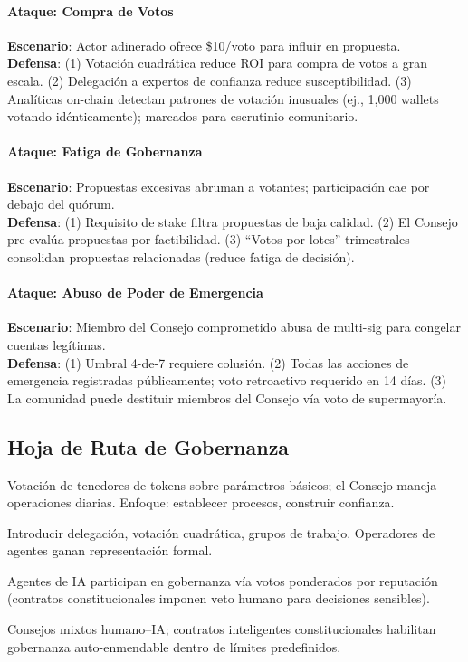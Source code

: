 \documentclass[11pt]{article}
\begin{document}
\paragraph{Ataque: Compra de Votos}
\textbf{Escenario}: Actor adinerado ofrece \$10/voto para influir en propuesta.\\
\textbf{Defensa}: (1) Votación cuadrática reduce ROI para compra de votos a gran escala. (2) Delegación a expertos de confianza reduce susceptibilidad. (3) Analíticas on-chain detectan patrones de votación inusuales (ej., 1,000 wallets votando idénticamente); marcados para escrutinio comunitario.

\paragraph{Ataque: Fatiga de Gobernanza}
\textbf{Escenario}: Propuestas excesivas abruman a votantes; participación cae por debajo del quórum.\\
\textbf{Defensa}: (1) Requisito de stake filtra propuestas de baja calidad. (2) El Consejo pre-evalúa propuestas por factibilidad. (3) ``Votos por lotes'' trimestrales consolidan propuestas relacionadas (reduce fatiga de decisión).

\paragraph{Ataque: Abuso de Poder de Emergencia}
\textbf{Escenario}: Miembro del Consejo comprometido abusa de multi-sig para congelar cuentas legítimas.\\
\textbf{Defensa}: (1) Umbral 4-de-7 requiere colusión. (2) Todas las acciones de emergencia registradas públicamente; voto retroactivo requerido en 14 días. (3) La comunidad puede destituir miembros del Consejo vía voto de supermayoría.

\subsection{Hoja de Ruta de Gobernanza}

\begin{description}[style=nextline]
  \item[Fase 1 (v3.0--v3.5, MERCURIO Temprano)] Votación de tenedores de tokens sobre parámetros básicos; el Consejo maneja operaciones diarias. Enfoque: establecer procesos, construir confianza.
  \item[Fase 2 (v4.0, MERCURIO Medio)] Introducir delegación, votación cuadrática, grupos de trabajo. Operadores de agentes ganan representación formal.
  \item[Fase 3 (v5.0, MERCURIO Tardío)] Agentes de IA participan en gobernanza vía votos ponderados por reputación (contratos constitucionales imponen veto humano para decisiones sensibles).
  \item[Fase 4 (VENUS+)] Consejos mixtos humano--IA; contratos inteligentes constitucionales habilitan gobernanza auto-enmendable dentro de límites predefinidos.
\end{description}
\end{document}
